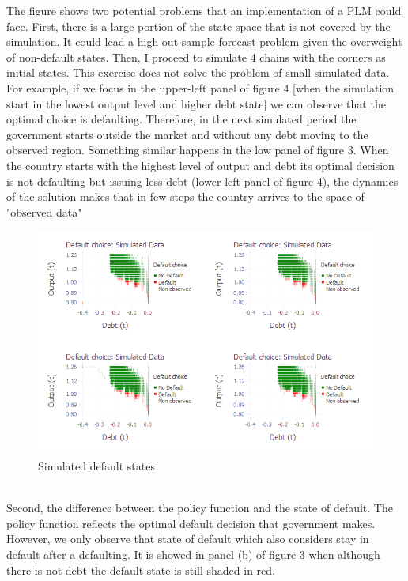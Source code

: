 \documentclass[12pt, a4paper]{article}
\begin{document}
The figure shows two potential problems that an implementation of a PLM could face. First, there is a large portion of the state-space that is not covered by the simulation. It could lead a high out-sample forecast problem given the overweight of non-default states. Then, I proceed to simulate 4 chains with the corners as initial states. This exercise does not solve the problem of small simulated data. For example, if we focus in the upper-left panel of figure 4 [when the simulation start in the lowest output level and higher debt state] we can observe that the optimal choice is defaulting. Therefore, in the next simulated period the government starts outside the market and without any debt moving to the observed region. Something similar happens in the low panel of figure 3. When the country starts with the highest level of output and debt its optimal decision is not defaulting but issuing less debt (lower-left panel of figure 4), the dynamics of the solution makes that in few steps the country arrives to the space of "observed data"
\begin{figure}[!hbt]
	\centering
	\caption{Simulated default states}
	\includegraphics[scale=0.7]{../Plots/heats.png}
	\begin{minipage}{0.65\textwidth}
		{\scriptsize\par}
	\end{minipage}
\end{figure}
\\
Second, the difference between the policy function and the state of default. The policy function reflects the optimal default decision that government makes. However, we only observe that state of default which also considers stay in default after a defaulting. It is showed in panel (b) of figure 3  when although there is not debt the default state is still shaded in red.\\
\end{document}
